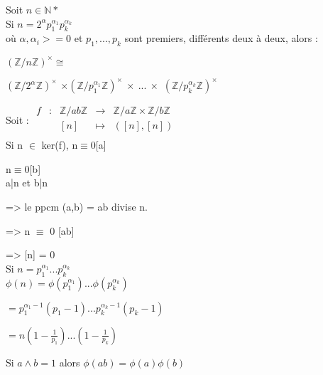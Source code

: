 \begin{cor}
	Soit $n \in \mathbb{N}*$\\
	Si $n = 2^{\alpha} p_{1}^{\alpha_{1}} p_{k}^{\alpha_{k}}$\\
	où  $\alpha, \alpha_{i} >= 0$ et $p_{1}, ..., p_{k}$ sont premiers, différents deux à deux, alors :
	
	$(\mathbb{Z}/n\mathbb{Z})^{\times} \cong$
	
	$(\mathbb{Z}/2^{\alpha}\mathbb{Z})^{\times}$
	$\times (\mathbb{Z}/p_{1}^{\alpha_{1}}\mathbb{Z})^{\times}\ \times\ ...\ \times$
	$(\mathbb{Z}/p_{k}^{\alpha_{k}}\mathbb{Z})^{\times}$
	
\end{cor}
\begin{thm}
	Soit : 
	$\begin{array}{ccccc}
		f & : & \mathbb{Z}/ab\mathbb{Z} & \to &  \mathbb{Z}/a\mathbb{Z} \times \mathbb{Z}/b\mathbb{Z} \\
		& & [n] & \mapsto & ([n], [n]) \\
	\end{array}$\\ 

	Si n $\in$ ker(f), n$\equiv$0[a]
	
						n$\equiv$0[b]\\
			a|n et b|n 
			
			=> le ppcm (a,b) = ab divise n.
			
			=> n $\equiv$ 0 [ab]
			
			=> [n] = 0\\
	Si $n = p_{1}^{\alpha_{1}} ... p_{k}^{\alpha_{k}}$\\
	$\phi(n) = \phi(p_1^{\alpha_1})... \phi(p_k^{\alpha_k})$
	
	$=p_1^{\alpha_1-1}(p_1-1) ... p_k^{\alpha_k-1}(p_k-1)$
	
	$=n(1-\frac{1}{p_1})...(1-\frac{1}{p_k})$
\end{thm}

\begin{prop}
	Si $a\wedge b = 1$ alors $\phi(ab) = \phi(a)\phi(b)$
\end{prop}



